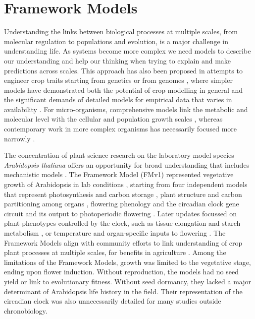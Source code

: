 \documentclass[phd]{infthesis}
\begin{document}
\chapter{Framework Models}

Understanding the links between biological processes at multiple scales, from
molecular regulation to populations and evolution, is a major challenge in
understanding life. As systems become more complex we need models to describe
our understanding and help our thinking when trying to explain and make
predictions across scales. This approach has also been proposed in attempts to
engineer crop traits starting from genetics or from genomes
\citep{welch_merging_2005, yin_applying_nodate, yin_modelling_2010,
  parent_can_2014, wu_connecting_2016, chenu_integrating_2018}, where simpler
models have demonstrated both the potential of crop modelling in general and the
significant demands of detailed models for empirical data that varies in
availability \citep{hammer_models_2006,asseng_uncertainty_2013}. For
micro-organisms, comprehensive models link the metabolic and molecular level
with the cellular \citep{karr_whole-cell_2012} and population growth scales
\citep{weise_mechanistic_2015}, whereas contemporary work in more complex
organisms has necessarily focused more narrowly \citep{buckley_modelling_2013;
  lynch_steep_2013, zhu_e-photosynthesis:_2013,klose_systematic_2015,
  le_novere_quantitative_2015, hepworth_absence_2018}.

The concentration of plant science research on the laboratory model species
\emph{Arabidopsis thaliana} offers an opportunity for broad understanding that
includes mechanistic models
\citep{chew_mathematical_2014,voss_modelling_2014}. The Framework Model (FMv1)
represented vegetative growth of Arabidopsis in lab conditions
\citep{chew_multiscale_2014}, starting from four independent models that
represent photosynthesis and carbon storage \citep{rasse_leaf_2006}, plant
structure and carbon partitioning among organs
\citep{christophe_model-based_2008}, flowering phenology
\citep{chew_augmented_2012} and the circadian clock gene circuit and its output
to photoperiodic flowering \citep{salazar_prediction_2009}. Later updates
focussed on plant phenotypes controlled by the clock, such as tissue elongation
and starch metabolism \citep[FMv2;][]{chew_linking_2017}, or temperature and
organ-specific inputs to flowering
\citep{kinmonth-schultz_mechanistic_2018}. The Framework Models align with
community efforts to link understanding of crop plant processes at multiple
scales, for benefits in agriculture \citep{wu_connecting_2016,
  zhu_plants_2016}. Among the limitations of the Framework Models, growth was
limited to the vegetative stage, ending upon flower induction. Without
reproduction, the models had no seed yield or link to evolutionary
fitness. Without seed dormancy, they lacked a major determinant of Arabidopsis
life history in the field. Their representation of the circadian clock was also
unnecessarily detailed for many studies outside chronobiology.
\end{document}

